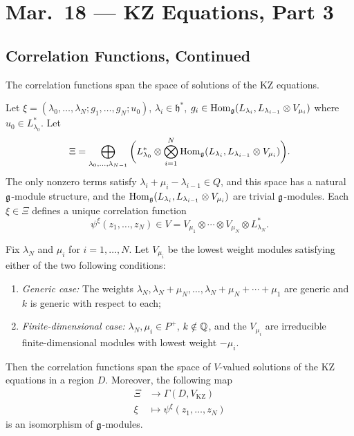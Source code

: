 \chapter{Mar.~18 --- KZ Equations, Part 3}

\section{Correlation Functions, Continued}

\begin{prop}
  The correlation functions span the
  space of solutions of the KZ equations.
\end{prop}

\begin{remark}
  Let $\xi = (\lambda_0, \dots, \lambda_N; g_1, \dots, g_N; u_0)$,
  $\lambda_i \in \mathfrak{h}^*$,
  $g_i \in \operatorname{Hom}_{\mathfrak{g}}(L_{\lambda_i}, L_{\lambda_{i - 1}} \otimes V_{\mu_i})$
  where $u_0 \in L_{\lambda_0}^*$. Let
  \[
    \Xi
    = \bigoplus_{\lambda_0, \dots, \lambda_{N - 1}} \bigg(
      L_{\lambda_0}^*
      \otimes \bigotimes_{i = 1}^N \operatorname{Hom}_{\mathfrak{g}}
      (L_{\lambda_i}, L_{\lambda_{i - 1}} \otimes V_{\mu_i})
    \bigg).
  \]
  The only nonzero terms satisfy
  $\lambda_i + \mu_i - \lambda_{i - 1} \in Q$,
  and this space has a natural
  $\mathfrak{g}$-module structure, and
  the $\operatorname{Hom}_{\mathfrak{g}}(L_{\lambda_i}, L_{\lambda_{i - 1}} \otimes V_{\mu_i})$ are
  trivial $\mathfrak{g}$-modules. Each $\xi \in \Xi$
  defines a unique correlation function
  \[
    \psi^\xi(z_1, \dots, z_N)
    \in V
    = V_{\mu_1} \otimes \cdots \otimes V_{\mu_N} \otimes L_{\lambda_N}^*.
  \]
\end{remark}

\begin{theorem}\label{thm:correlation-functions-span-solutions}
  Fix $\lambda_N$ and
  $\mu_i$ for $i = 1, \dots, N$. Let
  $V_{\mu_i}$ be the lowest weight modules
  satisfying either of the two
  following conditions:
  \begin{enumerate}
    \item \emph{Generic case:}
      The weights $\lambda_N, \lambda_N + \mu_N, \dots, \lambda_N + \mu_N + \cdots + \mu_1$
      are generic and $k$ is generic with
      respect to each;
    \item \emph{Finite-dimensional case:}
      $\lambda_N, \mu_i \in P^+$,
      $k \notin \mathbb{Q}$, and the $V_{\mu_i}$
      are irreducible finite-dimensional
      modules with lowest weight $-\mu_i$.
  \end{enumerate}
  Then the correlation functions span
  the space of $V$-valued solutions
  of the KZ equations in a region $D$.
  Moreover, the following map
  \begin{align*}
    \Xi &\longrightarrow \Gamma(D, V_{\mathrm{KZ}}) \\
    \xi &\longmapsto \psi^\xi(z_1, \dots, z_N)
  \end{align*}
  is an isomorphism of $\mathfrak{g}$-modules.
\end{theorem}

